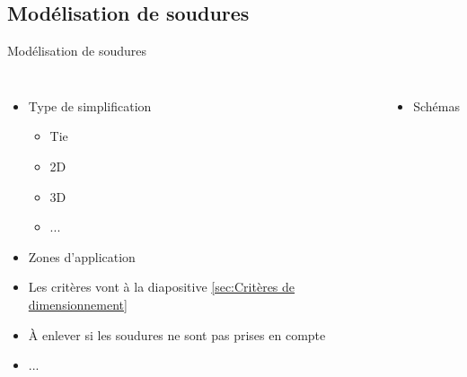 \subsection{Modélisation de soudures}
\label{sec:Modélisation de soudures}

\begin{frame}[c]{Modélisation de soudures}
  \begin{columns}
        \begin{itemize}
            \item Type de simplification
            \begin{itemize}
                \item Tie
                \item 2D
                \item 3D
                \item ...
            \end{itemize}
            \item Zones d'application
            \item Les critères vont à la diapositive \ref{sec:Critères de dimensionnement}
            \item À enlever si les soudures ne sont pas prises en compte
            \item ...
        \end{itemize}
    \begin{itemize}
        \item Schémas
    \end{itemize}
  \end{columns}
\end{frame}
